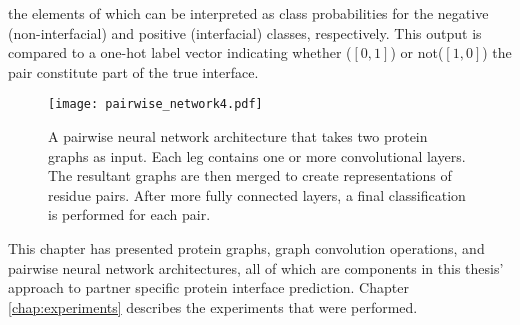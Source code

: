 \noindent
the elements of which can be interpreted as class probabilities for the negative (non-interfacial) and positive (interfacial) classes, respectively.
This output is compared to a one-hot label vector indicating whether \big($[0, 1]$\big) or not\big($[1, 0]$\big) the pair constitute part of the true interface. 

\begin{figure}
	\texttt{[image: pairwise\_network4.pdf]}
	\caption{A pairwise neural network architecture that takes two protein graphs as input. Each leg contains one or more convolutional layers. The resultant graphs are then merged to create representations of residue pairs. After more fully connected layers, a final classification is performed for each pair.}
	\label{fig:pairwise_arch1}
\end{figure}


This chapter has presented protein graphs, graph convolution operations, and pairwise neural network architectures, all of which are components in this thesis' approach to partner specific protein interface prediction.
Chapter \ref{chap:experiments} describes the experiments that were performed.

